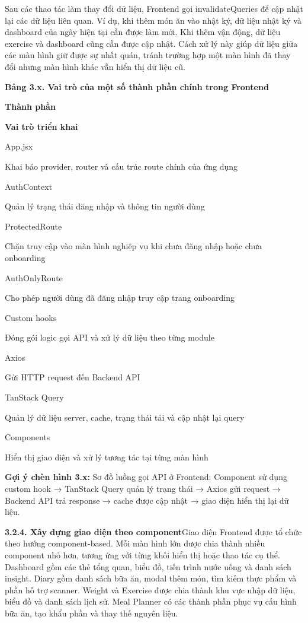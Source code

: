 Sau các thao tác làm thay đổi dữ liệu, Frontend gọi invalidateQueries để cập nhật lại các dữ liệu liên quan. Ví dụ, khi thêm món ăn vào nhật ký, dữ liệu nhật ký và dashboard của ngày hiện tại cần được làm mới. Khi thêm vận động, dữ liệu exercise và dashboard cũng cần được cập nhật. Cách xử lý này giúp dữ liệu giữa các màn hình giữ được sự nhất quán, tránh trường hợp một màn hình đã thay đổi nhưng màn hình khác vẫn hiển thị dữ liệu cũ.

\textbf{Bảng 3.x. Vai trò của một số thành phần chính trong Frontend}

\textbf{Thành phần}

\textbf{Vai trò triển khai}

App.jsx

Khai báo provider, router và cấu trúc route chính của ứng dụng

AuthContext

Quản lý trạng thái đăng nhập và thông tin người dùng

ProtectedRoute

Chặn truy cập vào màn hình nghiệp vụ khi chưa đăng nhập hoặc chưa onboarding

AuthOnlyRoute

Cho phép người dùng đã đăng nhập truy cập trang onboarding

Custom hooks

Đóng gói logic gọi API và xử lý dữ liệu theo từng module

Axios

Gửi HTTP request đến Backend API

TanStack Query

Quản lý dữ liệu server, cache, trạng thái tải và cập nhật lại query

Components

Hiển thị giao diện và xử lý tương tác tại từng màn hình

\textbf{Gợi ý chèn hình 3.x:} Sơ đồ luồng gọi API ở Frontend: Component sử dụng custom hook → TanStack Query quản lý trạng thái → Axios gửi request → Backend API trả response → cache được cập nhật → giao diện hiển thị lại dữ liệu.

\textbf{3.2.4. Xây dựng giao diện theo component}Giao diện Frontend được tổ chức theo hướng component-based. Mỗi màn hình lớn được chia thành nhiều component nhỏ hơn, tương ứng với từng khối hiển thị hoặc thao tác cụ thể. Dashboard gồm các thẻ tổng quan, biểu đồ, tiến trình nước uống và danh sách insight. Diary gồm danh sách bữa ăn, modal thêm món, tìm kiếm thực phẩm và phần hỗ trợ scanner. Weight và Exercise được chia thành khu vực nhập dữ liệu, biểu đồ và danh sách lịch sử. Meal Planner có các thành phần phục vụ cấu hình bữa ăn, tạo khẩu phần và thay thế nguyên liệu.

